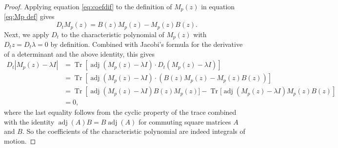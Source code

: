 \documentclass[a4paper,reqno]{amsart}
\numberwithin{equation}{section}
\numberwithin{figure}{section}
\theoremstyle{remark}
\begin{document}
\begin{proof}
Applying equation \eqref{eq:coefdif} to the definition of $M_p(z)$ in equation \eqref{eq:Mp def} gives
\begin{equation}\nonumber
    D_t M_p(z)= B(z)M_p(z)-M_p(z)B(z).
\end{equation}
Next, we apply $D_t$ to the characteristic polynomial of $M_p(z)$ with $D_tz=D_t\lambda=0$ by definition. Combined with Jacobi's formula for the derivative of a determinant and the above identity, this gives
\begin{align*}
    D_t |M_p(z)-\lambda I|&=\operatorname{Tr}\left[\operatorname{adj}(M_p(z)-\lambda I)\cdot D_t (M_p(z)-\lambda I)\right]\\
    &=\operatorname{Tr}\left[\operatorname{adj}(M_p(z)-\lambda I)\cdot (B(z)M_p(z)-M_p(z)B(z))\right]\\
    &=\operatorname{Tr}\left[\operatorname{adj}(M_p(z)-\lambda I)B(z)M_p(z)]-\operatorname{Tr}[\operatorname{adj}(M_p(z)-\lambda I)M_p(z)B(z)\right]
    \\
     &=0,
\end{align*}
where the last equality follows from the cyclic property of the trace combined with the identity $\operatorname{adj}(A) B=B\operatorname{adj}(A)$ for commuting square matrices $A$ and $B$. So the coefficients of the characteristic polynomial are indeed integrals of motion.
\end{proof}
\end{document}
